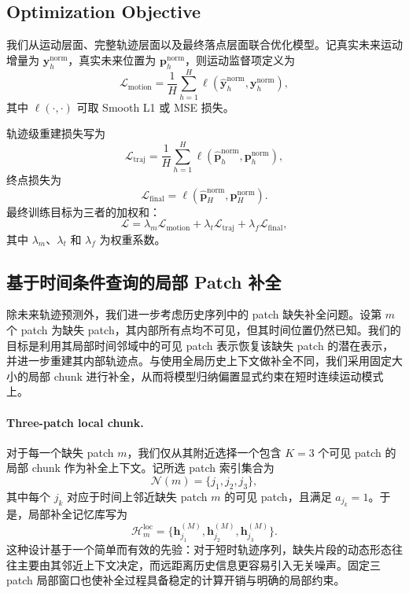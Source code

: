 \subsection{Optimization Objective}
\label{subsec:loss}

我们从运动层面、完整轨迹层面以及最终落点层面联合优化模型。记真实未来运动增量为 $\bm{y}_h^{\mathrm{norm}}$，真实未来位置为 $\bm{p}_h^{\mathrm{norm}}$，则运动监督项定义为
\begin{equation}
\mathcal{L}_{\mathrm{motion}} =
\frac{1}{H} \sum_{h=1}^{H}
\ell\!\left(\hat{\bm{y}}_h^{\mathrm{norm}}, \bm{y}_h^{\mathrm{norm}}\right),
\end{equation}
其中 $\ell(\cdot,\cdot)$ 可取 Smooth L1 或 MSE 损失。

轨迹级重建损失写为
\begin{equation}
\mathcal{L}_{\mathrm{traj}} =
\frac{1}{H} \sum_{h=1}^{H}
\ell\!\left(\hat{\bm{p}}_h^{\mathrm{norm}}, \bm{p}_h^{\mathrm{norm}}\right),
\end{equation}
终点损失为
\begin{equation}
\mathcal{L}_{\mathrm{final}} =
\ell\!\left(\hat{\bm{p}}_H^{\mathrm{norm}}, \bm{p}_H^{\mathrm{norm}}\right).
\end{equation}
最终训练目标为三者的加权和：
\begin{equation}
\mathcal{L} =
\lambda_m \mathcal{L}_{\mathrm{motion}} +
\lambda_t \mathcal{L}_{\mathrm{traj}} +
\lambda_f \mathcal{L}_{\mathrm{final}},
\end{equation}
其中 $\lambda_m$、$\lambda_t$ 和 $\lambda_f$ 为权重系数。

\subsection{基于时间条件查询的局部 Patch 补全}
\label{subsec:completion}

除未来轨迹预测外，我们进一步考虑历史序列中的 patch 缺失补全问题。设第 $m$ 个 patch 为缺失 patch，其内部所有点均不可见，但其时间位置仍然已知。我们的目标是利用其局部时间邻域中的可见 patch 表示恢复该缺失 patch 的潜在表示，并进一步重建其内部轨迹点。与使用全局历史上下文做补全不同，我们采用固定大小的局部 chunk 进行补全，从而将模型归纳偏置显式约束在短时连续运动模式上。

\paragraph{Three-patch local chunk.}
对于每一个缺失 patch $m$，我们仅从其附近选择一个包含 $K=3$ 个可见 patch 的局部 chunk 作为补全上下文。记所选 patch 索引集合为
\begin{equation}
\mathcal{N}(m) = \{j_1, j_2, j_3\},
\end{equation}
其中每个 $j_k$ 对应于时间上邻近缺失 patch $m$ 的可见 patch，且满足 $a_{j_k}=1$。于是，局部补全记忆库写为
\begin{equation}
\mathcal{H}_m^{\mathrm{loc}} = \{\bm{h}_{j_1}^{(M)}, \bm{h}_{j_2}^{(M)}, \bm{h}_{j_3}^{(M)}\}.
\end{equation}
这种设计基于一个简单而有效的先验：对于短时轨迹序列，缺失片段的动态形态往往主要由其邻近上下文决定，而远距离历史信息更容易引入无关噪声。固定三 patch 局部窗口也使补全过程具备稳定的计算开销与明确的局部约束。

